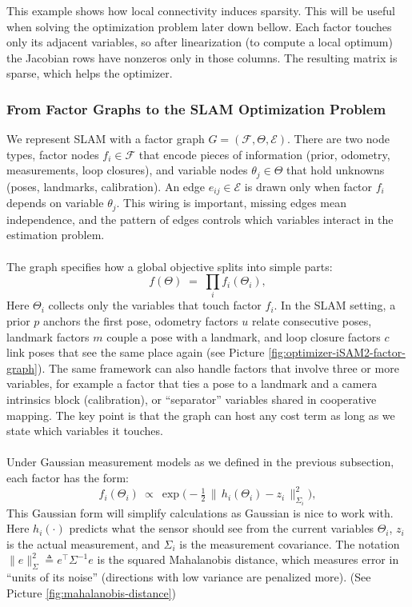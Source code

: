 \noindent
This example shows how local connectivity induces sparsity. This will be useful when solving the optimization problem later down bellow. Each factor touches only its adjacent variables, so after linearization (to compute a local optimum) the Jacobian rows have nonzeros only in those columns. The resulting matrix is sparse, which helps the optimizer.



\subsubsection{From Factor Graphs to the SLAM Optimization Problem}
We represent \gls{SLAM} with a factor graph $G=(\mathcal{F},\Theta,\mathcal{E})$. There are two node types, factor nodes $f_i\in\mathcal{F}$ that encode pieces of information (prior, odometry, measurements, loop closures), and variable nodes $\theta_j\in\Theta$ that hold unknowns (poses, landmarks, calibration). An edge $e_{ij}\in\mathcal{E}$ is drawn only when factor $f_i$ depends on variable $\theta_j$. This wiring is important, missing edges mean independence, and the pattern of edges controls which variables interact in the estimation problem.
\\ \\
The graph specifies how a global objective splits into simple parts:
\[
    f(\Theta)\;=\;\prod_i f_i(\Theta_i),
\]
Here $\Theta_i$ collects only the variables that touch factor $f_i$. In the \gls{SLAM} setting, a prior $p$ anchors the first pose, odometry factors $u$ relate consecutive poses, landmark factors $m$ couple a pose with a landmark, and loop closure factors $c$ link poses that see the same place again (see Picture \ref{fig:optimizer-iSAM2-factor-graph}). The same framework can also handle factors that involve three or more variables, for example a factor that ties a pose to a landmark and a camera intrinsics block (calibration), or ``separator'' variables shared in cooperative mapping. The key point is that the graph can host any cost term as long as we state which variables it touches.
\\ \\
Under Gaussian measurement models as we defined in the previous subsection, each factor has the form:
\[
    f_i(\Theta_i)\ \propto\ \exp\!\Big(-\tfrac12\,\|\,h_i(\Theta_i)-z_i\,\|^2_{\Sigma_i}\Big),
\]
This Gaussian form will simplify calculations as Gaussian is nice to work with. Here $h_i(\cdot)$ predicts what the sensor should see from the current variables $\Theta_i$, $z_i$ is the actual measurement, and $\Sigma_i$ is the measurement covariance. The notation $\|e\|^2_{\Sigma}\triangleq e^\top \Sigma^{-1} e$ is the squared Mahalanobis distance, which measures error in ``units of its noise'' (directions with low variance are penalized more). (See Picture \ref{fig:mahalanobis-distance})
